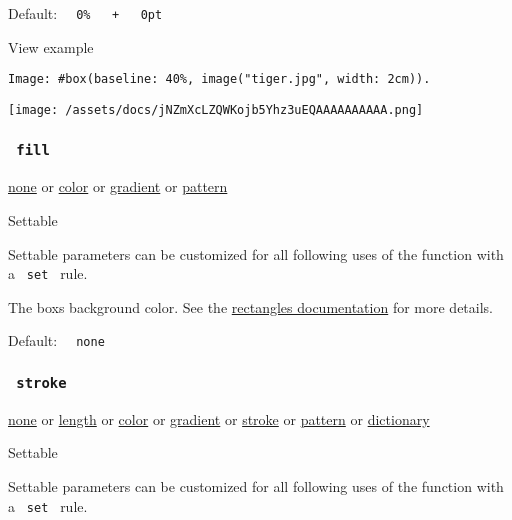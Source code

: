 Default:
\texttt{\ }{\texttt{\ 0\%\ }}\texttt{\ }{\texttt{\ +\ }}\texttt{\ }{\texttt{\ 0pt\ }}\texttt{\ }


View example

\begin{verbatim}
Image: #box(baseline: 40%, image("tiger.jpg", width: 2cm)).
\end{verbatim}

\texttt{[image: /assets/docs/jNZmXcLZQWKojb5Yhz3uEQAAAAAAAAAA.png]}

\subsubsection{\texorpdfstring{\texttt{\ fill\ }}{ fill }}\label{parameters-fill}

\href{/docs/reference/foundations/none/}{none} {or}
\href{/docs/reference/visualize/color/}{color} {or}
\href{/docs/reference/visualize/gradient/}{gradient} {or}
\href{/docs/reference/visualize/pattern/}{pattern}

{{ Settable }}

\label{parameters-fill-settable-tooltip}
Settable parameters can be customized for all following uses of the
function with a \texttt{\ set\ } rule.

The box\textquotesingle s background color. See the
\href{/docs/reference/visualize/rect/\#parameters-fill}{rectangle\textquotesingle s
documentation} for more details.

Default: \texttt{\ }{\texttt{\ none\ }}\texttt{\ }

\subsubsection{\texorpdfstring{\texttt{\ stroke\ }}{ stroke }}\label{parameters-stroke}

\href{/docs/reference/foundations/none/}{none} {or}
\href{/docs/reference/layout/length/}{length} {or}
\href{/docs/reference/visualize/color/}{color} {or}
\href{/docs/reference/visualize/gradient/}{gradient} {or}
\href{/docs/reference/visualize/stroke/}{stroke} {or}
\href{/docs/reference/visualize/pattern/}{pattern} {or}
\href{/docs/reference/foundations/dictionary/}{dictionary}

{{ Settable }}

\label{parameters-stroke-settable-tooltip}
Settable parameters can be customized for all following uses of the
function with a \texttt{\ set\ } rule.

